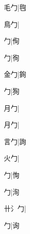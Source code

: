 \begin{multicols}{2}
{{\cjk{}{\cnsym{}　}毛勹}\mktsJzrVerticalBar{}{\cjk{}{\cnsym{}　}{\cnsym{}　}{\cnsym{}　}}|{\cjk{}毥}\par
{\cjk{}{\cnsym{}　}鳥勹}\mktsJzrVerticalBar{}{\cjk{}{\cnsym{}　}{\cnsym{}　}{\cnsym{}　}}|{}\par
{勹}\mktsJzrVerticalBar{}{\cjk{}{\cnsym{}　}{\cnsym{}　}{\cnsym{}　}}|{\cjk{}侚}\par
{勹}\mktsJzrVerticalBar{}{\cjk{}{\cnsym{}　}{\cnsym{}　}{\cnsym{}　}}|{\cjk{}徇}\par
{\cjk{}{\cnsym{}　}金勹}\mktsJzrVerticalBar{}{\cjk{}{\cnsym{}　}{\cnsym{}　}{\cnsym{}　}}|{\cjk{}銁}\par
{勹}\mktsJzrVerticalBar{}{\cjk{}{\cnsym{}　}{\cnsym{}　}{\cnsym{}　}}|{\cjk{}狥}\par
{\cjk{}{\cnsym{}　}月勹}\mktsJzrVerticalBar{}{\cjk{}{\cnsym{}　}{\cnsym{}　}{\cnsym{}　}}|{}\par
{月勹}\mktsJzrVerticalBar{}{\cjk{}{\cnsym{}　}{\cnsym{}　}{\cnsym{}　}}|{}\par
{\cjk{}{\cnsym{}　}言勹}\mktsJzrVerticalBar{}{\cjk{}{\cnsym{}　}{\cnsym{}　}{\cnsym{}　}}|{\cjk{}詢}\par
{\cjk{}{\cnsym{}　}火勹}\mktsJzrVerticalBar{}{\cjk{}{\cnsym{}　}{\cnsym{}　}{\cnsym{}　}}|{}\par
{勹}\mktsJzrVerticalBar{}{\cjk{}{\cnsym{}　}{\cnsym{}　}{\cnsym{}　}}|{\cjk{}恂}\par
{勹}\mktsJzrVerticalBar{}{\cjk{}{\cnsym{}　}{\cnsym{}　}{\cnsym{}　}}|{\cjk{}洵}\par
{\cjk{}卄{\cnxHanaA{}氵}勹}\mktsJzrVerticalBar{}{\cjk{}{\cnsym{}　}{\cnsym{}　}{\cnsym{}　}}|{}\par
{勹}\mktsJzrVerticalBar{}{\cjk{}{\cnsym{}　}{\cnsym{}　}{\cnsym{}　}}|{\cjk{}询}\par
}
\end{multicols}
